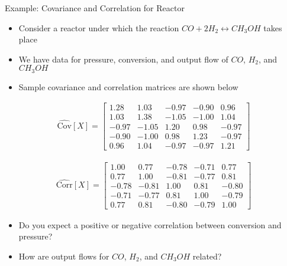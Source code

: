 \documentclass[9pt]{beamer}
\begin{document}
%
\begin{frame}{Example: Covariance and Correlation for Reactor}

\begin{itemize}
\item Consider a reactor under which the reaction $CO+2H_2\leftrightarrow CH_3OH$ takes place
\item We have data for pressure, conversion, and output flow of $CO$, $H_2$, and $CH_3OH$
\item Sample covariance and correlation matrices are shown below
\end{itemize}

\begin{align*}
\hat{\textrm{Cov}}[X]=\left[\begin{array}{ccccc}
 		  1.28   &       1.03   &      -0.97    &     -0.90    &      0.96\\
          1.03     &     1.38    &     -1.05    &     -1.00    &      1.04\\
         -0.97      &   -1.05    &      1.20    &      0.98    &     -0.97\\
         -0.90   &      -1.00    &      0.98   &       1.23   &      -0.97\\
          0.96     &     1.04     &    -0.97    &     -0.97   &       1.21
\end{array}\right]
\end{align*}

\begin{align*}
\hat{\textrm{Corr}}[X]=\left[\begin{array}{ccccc}
1.00   &       0.77   &      -0.78   &      -0.71    &      0.77\\
          0.77    &      1.00    &     -0.81    &     -0.77    &      0.81\\
         -0.78   &      -0.81   &       1.00   &       0.81   &      -0.80\\
         -0.71    &     -0.77   &       0.81    &      1.00     &    -0.79\\
          0.77     &     0.81    &     -0.80    &     -0.79    &      1.00
\end{array}\right]
\end{align*}

\begin{block}{}
\begin{itemize}
\item Do you expect a positive or negative correlation between conversion and pressure?
 \item How are output flows for $CO$, $H_2$, and $CH_3OH$ related?
\end{itemize}
\end{block}

\end{frame}
\end{document}
